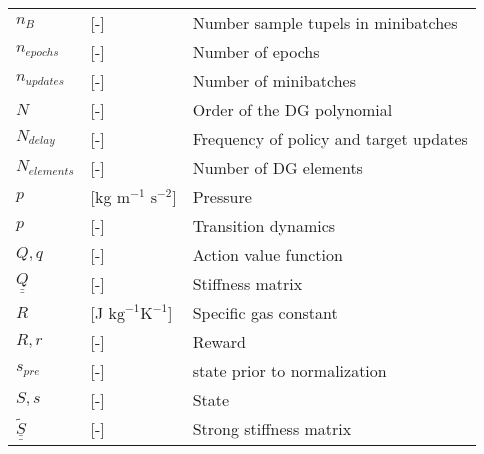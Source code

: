 \begin{tabular}{lll}
   \vspace{1mm}
   $n_{B}$              & [-]             & Number sample tupels in minibatches\\
   \vspace{1mm}
      $n_{epochs}$              & [-]             & Number of epochs\\
    \vspace{1mm}
   $n_{updates}$              & [-]             & Number of minibatches\\
       \vspace{1mm}
     $N$              & [-]             & Order of the DG polynomial\\     
   \vspace{1mm}
   $N_{delay}$              & [-]             & Frequency of policy and target updates \\
          \vspace{1mm}
   $N_{elements}$              & [-]             & Number of DG elements \\
    \vspace{1mm}
  $p$              & [kg $\text{m}^{-1}$ $\text{s}^{-2}$]             & Pressure \\  
  \vspace{1mm}
   $p$              & [-]             & Transition dynamics\\    
   \vspace{1mm}
   $Q,q$              & [-]             & Action value function\\
    \vspace{1mm}  
      $\underline{\underline{Q}}$              & [-]             & Stiffness matrix\\     
   \vspace{1mm}
  $R$              & [J $\text{kg}^{-1}\text{K}^{-1}$]             & Specific gas constant \\   
   \vspace{1mm}
   $R,r$              & [-]             & Reward\\ 
       \vspace{1mm}
   $s_{pre}$              & [-]             & state prior to normalization\\ 
   \vspace{1mm}
      $S,s$              & [-]             & State\\    
    \vspace{1mm}
   $\underline{\underline{\tilde{S}}}$              & [-]             & Strong stiffness matrix\\

\end{tabular}
